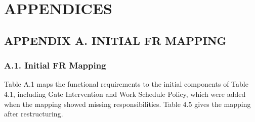 \section*{APPENDICES}


\subsection*{APPENDIX A. INITIAL FR MAPPING}


\subsubsection*{A.1. Initial FR Mapping}


Table A.1 maps the functional requirements to the initial components of Table 4.1, including Gate Intervention and Work Schedule Policy, which were added when the mapping showed missing responsibilities. Table 4.5 gives the mapping after restructuring.


